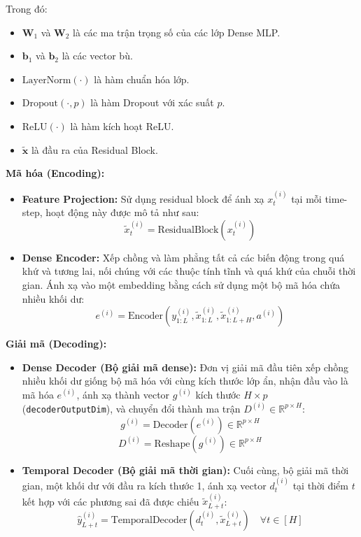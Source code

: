 Trong đó:
\begin{itemize}
    \item \( \mathbf{W}_1 \) và \( \mathbf{W}_2 \) là các ma trận trọng số của các lớp Dense MLP.
    \item \( \mathbf{b}_1 \) và \( \mathbf{b}_2 \) là các vector bù.
    \item \(\text{LayerNorm}(\cdot)\) là hàm chuẩn hóa lớp.
    \item \(\text{Dropout}(\cdot, p)\) là hàm Dropout với xác suất \( p \).
    \item \(\text{ReLU}(\cdot)\) là hàm kích hoạt ReLU.
    \item \(\tilde{\mathbf{x}}\) là đầu ra của Residual Block.
\end{itemize}

\textbf{Mã hóa (Encoding):}
\begin{itemize}
    \item \textbf{Feature Projection:} Sử dụng residual block để ánh xạ \( x_t^{(i)} \) tại mỗi time-step, hoạt động này được mô tả như sau:
    \[
        \tilde{x}_t^{(i)} = \text{ResidualBlock}(x_t^{(i)}) 
    \]

    \item \textbf{Dense Encoder:} Xếp chồng và làm phẳng tất cả các biến động trong quá khứ và tương lai, nối chúng với các thuộc tính tĩnh và quá khứ của chuỗi thời gian. Ánh xạ vào một embedding bằng cách sử dụng một bộ mã hóa chứa nhiều khối dư:
    \[
    e^{(i)} = \text{Encoder}\left( y_{1:L}^{(i)}, \tilde{x}_{1:L}^{(i)}, \tilde{x}_{1:L+H}^{(i)}, a^{(i)} \right)
    \]
\end{itemize}

\textbf{Giải mã (Decoding):}

\begin{itemize}
    \item \textbf{Dense Decoder (Bộ giải mã dense):} Đơn vị giải mã đầu tiên xếp chồng nhiều khối dư giống bộ mã hóa với cùng kích thước lớp ẩn, nhận đầu vào là mã hóa \( e^{(i)} \), ánh xạ thành vector \( g^{(i)} \) kích thước \( H \times p \) (\texttt{decoderOutputDim}), và chuyển đổi thành ma trận \( D^{(i)} \in \mathbb{R}^{p \times H} \):
    \[
    g^{(i)} = \text{Decoder}(e^{(i)}) \in \mathbb{R}^{p \times H}
    \]
    \[
    D^{(i)} = \text{Reshape}(g^{(i)}) \in \mathbb{R}^{p \times H}
    \]

    \item \textbf{Temporal Decoder (Bộ giải mã thời gian):} Cuối cùng, bộ giải mã thời gian, một khối dư với đầu ra kích thước 1, ánh xạ vector \( d^{(i)}_t \) tại thời điểm \( t \) kết hợp với các phương sai đã được chiếu \( \tilde{x}^{(i)}_{L+t} \):
    \[
    \hat{y}^{(i)}_{L+t} = \text{TemporalDecoder}(d^{(i)}_t, \tilde{x}^{(i)}_{L+t}) \quad \forall t \in [H]
    \]
\end{itemize}